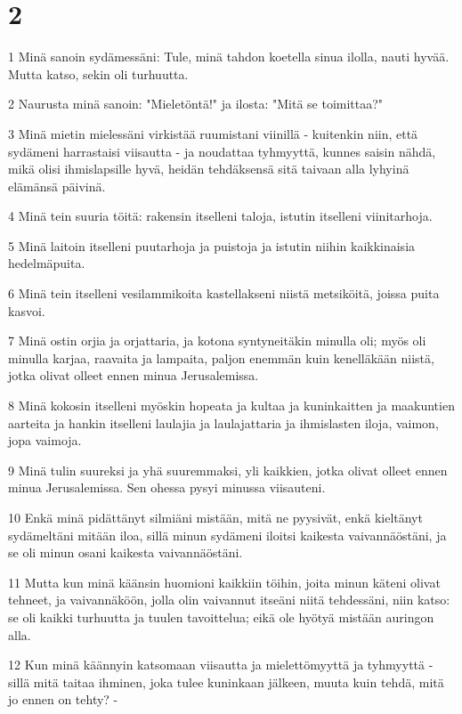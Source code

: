 \chapter{2}

\par 1 Minä sanoin sydämessäni: Tule, minä tahdon koetella sinua ilolla, nauti hyvää. Mutta katso, sekin oli turhuutta.
\par 2 Naurusta minä sanoin: "Mieletöntä!" ja ilosta: "Mitä se toimittaa?"
\par 3 Minä mietin mielessäni virkistää ruumistani viinillä - kuitenkin niin, että sydämeni harrastaisi viisautta - ja noudattaa tyhmyyttä, kunnes saisin nähdä, mikä olisi ihmislapsille hyvä, heidän tehdäksensä sitä taivaan alla lyhyinä elämänsä päivinä.
\par 4 Minä tein suuria töitä: rakensin itselleni taloja, istutin itselleni viinitarhoja.
\par 5 Minä laitoin itselleni puutarhoja ja puistoja ja istutin niihin kaikkinaisia hedelmäpuita.
\par 6 Minä tein itselleni vesilammikoita kastellakseni niistä metsiköitä, joissa puita kasvoi.
\par 7 Minä ostin orjia ja orjattaria, ja kotona syntyneitäkin minulla oli; myös oli minulla karjaa, raavaita ja lampaita, paljon enemmän kuin kenelläkään niistä, jotka olivat olleet ennen minua Jerusalemissa.
\par 8 Minä kokosin itselleni myöskin hopeata ja kultaa ja kuninkaitten ja maakuntien aarteita ja hankin itselleni laulajia ja laulajattaria ja ihmislasten iloja, vaimon, jopa vaimoja.
\par 9 Minä tulin suureksi ja yhä suuremmaksi, yli kaikkien, jotka olivat olleet ennen minua Jerusalemissa. Sen ohessa pysyi minussa viisauteni.
\par 10 Enkä minä pidättänyt silmiäni mistään, mitä ne pyysivät, enkä kieltänyt sydämeltäni mitään iloa, sillä minun sydämeni iloitsi kaikesta vaivannäöstäni, ja se oli minun osani kaikesta vaivannäöstäni.
\par 11 Mutta kun minä käänsin huomioni kaikkiin töihin, joita minun käteni olivat tehneet, ja vaivannäköön, jolla olin vaivannut itseäni niitä tehdessäni, niin katso: se oli kaikki turhuutta ja tuulen tavoittelua; eikä ole hyötyä mistään auringon alla.
\par 12 Kun minä käännyin katsomaan viisautta ja mielettömyyttä ja tyhmyyttä - sillä mitä taitaa ihminen, joka tulee kuninkaan jälkeen, muuta kuin tehdä, mitä jo ennen on tehty? -
